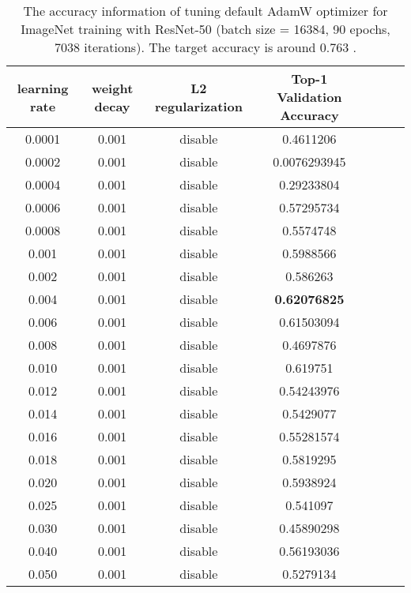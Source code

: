 \documentclass{article} \usepackage{iclr2020_conference,times}
\begin{document}
\begin{table}[ht]
\renewcommand{\arraystretch}{1.3}
\caption{The accuracy information of tuning default AdamW optimizer for ImageNet training with ResNet-50 (batch size = 16384, 90 epochs, 7038 iterations). The target accuracy is around 0.763 \citep{goyal2017accurate}.}
\centering
\begin{tabular}{|c|c|c|c|c|c|c|}
\hline
learning rate & weight decay & L2 regularization & Top-1 Validation Accuracy\\
\hline
\hline
0.0001 & 0.001 & disable & 0.4611206 \\
\hline
0.0002 & 0.001 & disable & 0.0076293945 \\
\hline
0.0004 & 0.001 & disable & 0.29233804 \\
\hline
0.0006 & 0.001 & disable & 0.57295734 \\
\hline
0.0008 & 0.001 & disable & 0.5574748 \\
\hline
0.001 & 0.001 & disable & 0.5988566 \\
\hline
0.002 & 0.001 & disable & 0.586263 \\
\hline
0.004 & 0.001 & disable & {\bf 0.62076825} \\
\hline
0.006 & 0.001 & disable & 0.61503094 \\
\hline
0.008 & 0.001 & disable & 0.4697876 \\
\hline
0.010 & 0.001 & disable & 0.619751 \\
\hline
0.012 & 0.001 & disable & 0.54243976 \\
\hline
0.014 & 0.001 & disable & 0.5429077 \\
\hline
0.016 & 0.001 & disable & 0.55281574 \\
\hline
0.018 & 0.001 & disable & 0.5819295 \\
\hline
0.020 & 0.001 & disable & 0.5938924 \\
\hline
0.025 & 0.001 & disable & 0.541097 \\
\hline
0.030 & 0.001 & disable & 0.45890298 \\
\hline
0.040 & 0.001 & disable & 0.56193036 \\
\hline
0.050 & 0.001 & disable & 0.5279134 \\
\hline
\end{tabular}
\label{table:imagenet_adamw_default_3}
\end{table}
\end{document}

